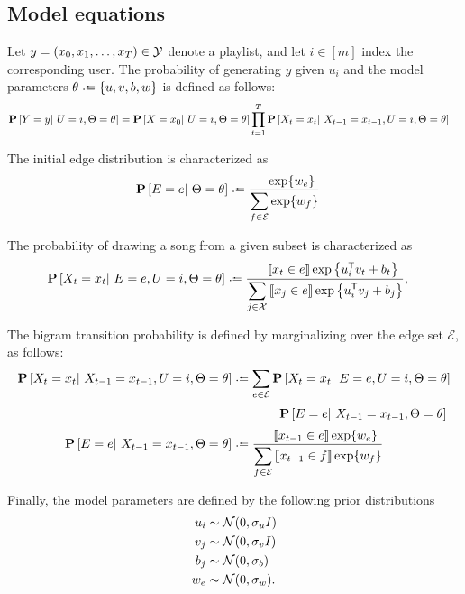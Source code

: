 \documentclass{article}
\def\E{\ensuremath{\mathcal{E}}}
\begin{document}
\subsection{Model equations}

Let $y = (x_0, x_1, \dots, x_T) \in \mathcal{Y}$ denote a playlist, and let $i \in [m]$ index the corresponding user.
The probability of generating $y$ given $u_i$ and the model parameters $\theta \defeq \{u, v, b, w\}$ is defined as follows:
\begin{align*}
\mathbf{P}\left[Y = y |~ U = i, \Theta = \theta \right] &= \mathbf{P}\left[X = x_0 |~ U = i, \Theta = \theta\right]
\prod_{t=1}^{T} \mathbf{P}\left[X_t = x_t |~ X_{t-1}=x_{t-1}, U=i, \Theta=\theta \right]
\end{align*}

The initial edge distribution is characterized as
\begin{align*}
\P\left[E = e \given \Theta = \theta\right] & \defeq \frac{\phantom\sum \exp\{w_e\}}{\displaystyle\sum_{f\in \E} \exp\{w_f\}}
\end{align*}

The probability of drawing a song from a given subset is characterized as
\begin{align*}
\P\left[X_t=x_t \given E=e, U=i, \Theta=\theta \right] &\defeq 
\frac{\phantom\sum\ind{x_t \in e}\exp\left\{u_i\trans v_t + b_t\right\}}{\displaystyle\sum_{j \in \X}\ind{x_j \in e} \exp\left\{u_i\trans v_j + b_j\right\}},
\end{align*}

The bigram transition probability is defined by marginalizing over the edge set $\E$, as follows:
\begin{align*}
\P\left[X_{t}= x_t \given X_{t-1}=x_{t-1}, U=i, \Theta=\theta \right] &\defeq \sum_{e \in \E} 
\P\left[X_{t}=x_t \given E=e, U=i, \Theta=\theta\right]\\
&\phantom{\defeq \sum}\quad\P\left[E=e \given X_{t-1} = x_{t-1}, \Theta=\theta\right]\\
\P\left[E=e \given X_{t-1}=x_{t-1}, \Theta=\theta\right] &\defeq \frac{\phantom\sum\ind{x_{t-1}\in e}\exp\{w_e\}}{ \displaystyle\sum_{f \in \E} \ind{x_{t-1} \in f} \exp\{w_f\} }
\end{align*}

Finally, the model parameters are defined by the following prior distributions
\begin{align*}
u_i &\sim \mathcal{N}(0, \sigma_u I)\\
v_j &\sim \mathcal{N}(0, \sigma_v I)\\
b_j &\sim \mathcal{N}(0, \sigma_b)\\
w_e &\sim \mathcal{N}(0, \sigma_w).\\
\end{align*}
\end{document}
